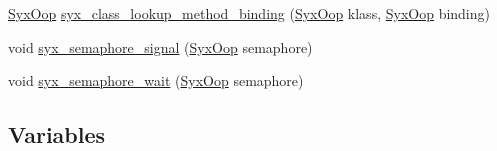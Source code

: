 \begin{CompactItemize}
\item 
\hyperlink{syx-types_8h_1121caba2d40b2ce090b640762744ccd}{SyxOop} \hyperlink{syx-object_8c_991b1329938b84d777d0ad23f778dba9}{syx\_\-class\_\-lookup\_\-method\_\-binding} (\hyperlink{syx-types_8h_1121caba2d40b2ce090b640762744ccd}{SyxOop} klass, \hyperlink{syx-types_8h_1121caba2d40b2ce090b640762744ccd}{SyxOop} binding)
\item 
void \hyperlink{syx-object_8c_eb6e7d880d0aa1250eb4ad3f0b55cb11}{syx\_\-semaphore\_\-signal} (\hyperlink{syx-types_8h_1121caba2d40b2ce090b640762744ccd}{SyxOop} semaphore)
\item 
void \hyperlink{syx-object_8c_1bfbb9a8a180f9bd9583321dc6925978}{syx\_\-semaphore\_\-wait} (\hyperlink{syx-types_8h_1121caba2d40b2ce090b640762744ccd}{SyxOop} semaphore)
\end{CompactItemize}
\subsection*{Variables}
